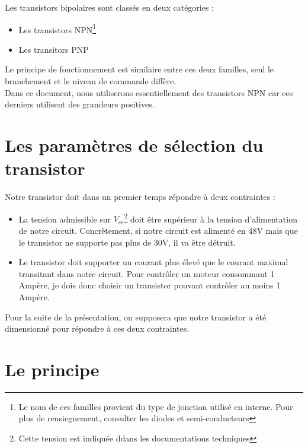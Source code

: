 Les transistors bipolaires sont classés en deux catégories : 

\begin{itemize}

  \item Les transistors NPN\footnote{Le nom de ces familles provient du type de jonction utilisé en interne. Pour plus de rensiegnement, consulter les diodes et semi-conducteurs}
  \item Les transitors PNP

\end{itemize}

Le principe de fonctionnement est similaire entre ces deux familles, seul le branchement et le niveau de commande diffère.\\
Dans ce document, nous utiliserons essentiellement des transistors NPN car ces derniers utilisent des grandeurs positives.



\section{Les paramètres de sélection du transistor}

Notre transistor doit dans un premier temps répondre à deux contraintes : 

\begin{itemize}

  \item La tension admissible sur $V_{ce}$\footnote{Cette tension est indiquée ddans les documentations techniques} doit être supérieur à la tension d'alimentation de notre circuit.
  Concrètement, si notre circuit est alimenté en 48V mais que le transistor ne supporte pas plus de 30V, il va être détruit.
  \item Le transistor doit supporter un courant plus élevé que le courant maximal transitant dans notre circuit.
  Pour contrôler un moteur consommant 1 Ampère, je dois donc choisir un transistor pouvant contrôler au moins 1 Ampère.
\end{itemize}

Pour la suite de la présentation, on supposera que notre transistor a été dimensionné pour répondre à ces deux contraintes.


\section{Le principe}

